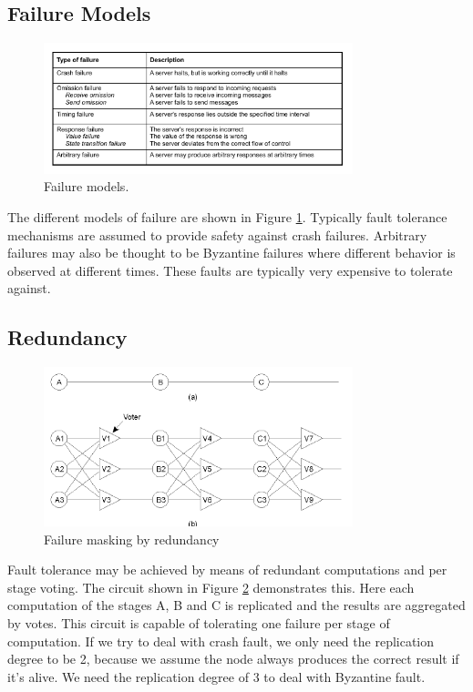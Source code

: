 \documentclass[twoside]{article}
\begin{document}
\subsection{Failure Models}
\begin{figure}
\begin{center}
   \includegraphics[width=0.8\textwidth]{failures.png}
   \caption{Failure models.}
   \label{fig:failures}
 \end{center}
\end{figure}
The different models of failure are shown in Figure \ref{fig:failures}. Typically fault tolerance mechanisms are assumed to provide safety against crash failures. Arbitrary failures may also be thought to be Byzantine failures where different behavior is observed at different times. These faults are typically very expensive to tolerate against.

\subsection{Redundancy}
\begin{figure}
\begin{center}
   \includegraphics[width=0.8\textwidth]{redundancy.png}
   \caption{Failure masking by redundancy}
   \label{fig:redundancy}
 \end{center}
\end{figure}
Fault tolerance may be achieved by means of redundant computations and per stage voting. The circuit shown in Figure \ref{fig:redundancy} demonstrates this. Here each computation of the stages A, B and C is replicated and the results are aggregated by votes. This circuit is capable of tolerating one failure per stage of computation. If we try to deal with crash fault, we only need the replication degree to be 2, because we assume the node always produces the correct result if it's alive. We need the replication degree of 3 to deal with Byzantine fault.
\end{document}

